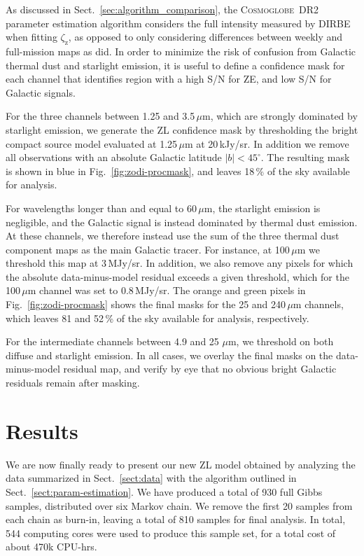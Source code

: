 \documentclass[twocolumn]{aa}
\newcommand{\cosmoglobe}{\textsc{Cosmoglobe}}
\begin{document}


As discussed in Sect.~\ref{sec:algorithm_comparison}, the
\cosmoglobe\ DR2 parameter estimation algorithm considers the full
intensity measured by DIRBE when fitting $\zeta_{\mathrm{z}}$, as
opposed to only considering differences between weekly and
full-mission maps as \citet{Kelsall1998} did. In order to minimize the
risk of confusion from Galactic thermal dust and starlight emission,
it is useful to define a confidence mask for each channel that
identifies region with a high S/N for ZE, and low S/N for Galactic
signals.

For the three channels between 1.25 and 3.5\,$\mu$m, which are
strongly dominated by starlight emission, we generate the ZL
confidence mask by thresholding the bright compact source model
evaluated at 1.25\,$\mu$m at 20\,kJy/sr. In addition we remove all
observations with an absolute Galactic latitude $|b|<45^{\circ}$. The
resulting mask is shown in blue in Fig.~\ref{fig:zodi-procmask}, and
leaves 18\,\% of the sky available for analysis.

For wavelengths longer than and equal to 60\,$\mu$m, the starlight
emission is negligible, and the Galactic signal is instead dominated
by thermal dust emission. At these channels, we therefore instead use
the sum of the three thermal dust component maps as the main Galactic
tracer. For instance, at 100$\,\mu$m we threshold this map at
3\,MJy/sr. In addition, we also remove any pixels for which the
absolute data-minus-model residual exceeds a given threshold, which
for the 100$\,\mu$m channel was set to 0.8\,MJy/sr. The orange and
green pixels in Fig.~\ref{fig:zodi-procmask} shows the final masks for
the 25 and 240\,$\mu$m channels, which leaves 81 and 52\,\% of the sky
available for analysis, respectively.

For the intermediate channels between 4.9 and 25\,$\,\mu$m, we
threshold on both diffuse and starlight emission. In all cases, we
overlay the final masks on the data-minus-model residual map, and
verify by eye that no obvious bright Galactic residuals remain after
masking. 


\section{Results}\label{sect:improved-model}
We are now finally ready to present our new ZL model obtained
by analyzing the data summarized in Sect.~\ref{sect:data} with the
algorithm outlined in Sect.~\ref{sect:param-estimation}. We have
produced a total of 930 full Gibbs samples, distributed over six
Markov chain. We remove the first 20 samples from each chain as
burn-in, leaving a total of 810 samples for final analysis. In total,
544 computing cores were used to produce this sample set, for a
total cost of about 470k CPU-hrs.
\end{document}
